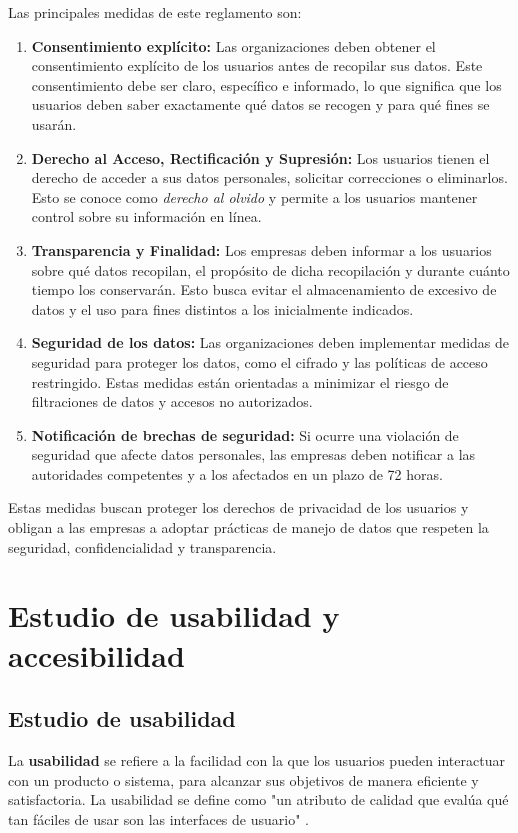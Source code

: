 Las principales medidas de este reglamento son: \cite{lopd2018}
\begin{enumerate}
    \item \textbf{Consentimiento explícito:} Las organizaciones deben obtener el consentimiento explícito de los usuarios antes de recopilar sus datos. Este consentimiento debe ser claro, específico e informado, lo que significa que los usuarios deben saber exactamente qué datos se recogen y para qué fines se usarán.
    \item \textbf{Derecho al Acceso, Rectificación y Supresión:} Los usuarios tienen el derecho de acceder a sus datos personales, solicitar correcciones o eliminarlos. Esto se conoce como \textit{derecho al olvido} y permite a los usuarios mantener control sobre su información en línea.
    \item \textbf{Transparencia y Finalidad:} Los empresas deben informar a los usuarios sobre qué datos recopilan, el propósito de dicha recopilación y durante cuánto tiempo los conservarán. Esto busca evitar el almacenamiento de excesivo de datos y el uso para fines distintos a los inicialmente indicados.
    \item \textbf{Seguridad de los datos:} Las organizaciones deben implementar medidas de seguridad para proteger los datos, como el cifrado y las políticas de acceso restringido. Estas medidas están orientadas a minimizar el riesgo de filtraciones de datos y accesos no autorizados.
    \item \textbf{Notificación de brechas de seguridad:} Si ocurre una violación de seguridad que afecte datos personales, las empresas deben notificar a las autoridades competentes y a los afectados en un plazo de 72 horas.
\end{enumerate}

Estas medidas buscan proteger los derechos de privacidad de los usuarios y obligan a las empresas a adoptar prácticas de manejo de datos que respeten la seguridad, confidencialidad y transparencia.


\newpage

\section{Estudio de usabilidad y accesibilidad}
\subsection{Estudio de usabilidad}

La \textbf{usabilidad} se refiere a la facilidad con la que los usuarios pueden interactuar con un producto o sistema, para alcanzar sus objetivos de manera eficiente y satisfactoria. La usabilidad se define como "un atributo de calidad que evalúa qué tan fáciles de usar son las interfaces de usuario" \cite{nielsen1993}.

